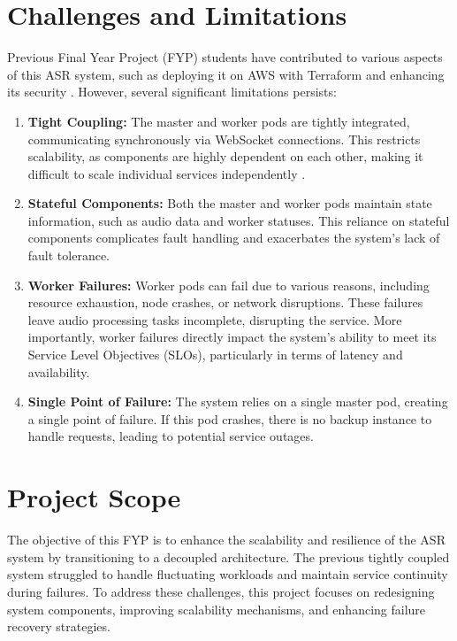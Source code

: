 \section{Challenges and Limitations}\label{section:challenges}
Previous Final Year Project (FYP) students have contributed to various aspects of this ASR system, such as deploying it on AWS with Terraform \cite{song_yu, kai_shern} and enhancing its security \cite{putra}. However, several significant limitations persists:
\begin{enumerate}
    \item \textbf{Tight Coupling:} The master and worker pods are tightly integrated, communicating synchronously via WebSocket connections. This restricts scalability, as components are highly dependent on each other, making it difficult to scale individual services independently \cite{tight_couple}.
    \item \textbf{Stateful Components:} Both the master and worker pods maintain state information, such as audio data and worker statuses. This reliance on stateful components complicates fault handling and exacerbates the system's lack of fault tolerance.
    \item \textbf{Worker Failures:} Worker pods can fail due to various reasons, including resource exhaustion, node crashes, or network disruptions. These failures leave audio processing tasks incomplete, disrupting the service. More importantly, worker failures directly impact the system’s ability to meet its Service Level Objectives (SLOs), particularly in terms of latency and availability.
    \item \textbf{Single Point of Failure:} The system relies on a single master pod, creating a single point of failure. If this pod crashes, there is no backup instance to handle requests, leading to potential service outages.
    
\end{enumerate}

\section{Project Scope}
The objective of this FYP is to enhance the scalability and resilience of the ASR system by transitioning to a decoupled architecture. The previous tightly coupled system struggled to handle fluctuating workloads and maintain service continuity during failures. To address these challenges, this project focuses on redesigning system components, improving scalability mechanisms, and enhancing failure recovery strategies.

